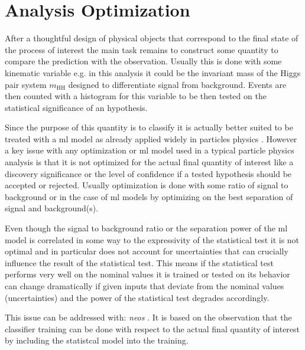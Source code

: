 \chapter{Analysis Optimization}\label{sec:analysis_optimization}
After a thoughtful design of physical objects that correspond to the final state of the process of interest the main task remains to construct some quantity to compare the prediction with the observation. Usually this is done with some kinematic variable e.g. in this analysis it could be the invariant mass of the Higgs pair system $m_\text{HH}$ designed to differentiate signal from background. Events are then counted with a histogram for this variable to be then tested on the statistical significance of an hypothesis.

Since the purpose of this quantity is to classify it is actually better suited to be treated with a \ac{ml} model as already applied widely in particles physics \citep{albertsson2019machine,shlomi2020graph,feickert2021living,Schwartz2021Modern}. However a key issue with any optimization or \ac{ml} model used in a typical particle physics analysis is that it is not optimized for the actual final quantity of interest like a discovery significance or the level of confidence if a tested hypothesis should be accepted or rejected. Usually optimization is done with some ratio of signal to background or in the case of \ac{ml} models by optimizing on the best separation of signal and background(s).

Even though the signal to background ratio or the separation power of the \ac{ml} model is correlated in some way to the expressivity of the statistical test it is not optimal and in particular does not account for uncertainties that can crucially influence the result of the statistical test. This means if the statistical test performs very well on the nominal values it is trained or tested on its behavior can change dramatically if given inputs that deviate from the nominal values (uncertainties) and the power of the statistical test degrades accordingly.

This issue can be addressed with: \textit{\ac{neos}} \citep{Simpson_2023}. It is based on the observation that the classifier training can be done with respect to the actual final quantity of interest by including the statistcal model into the training.


